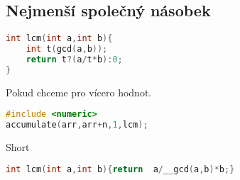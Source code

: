 \documentclass[11pt]{article}
\begin{document}
\subsection{Nejmenší společný násobek}
\begin{lstlisting}[language=C++]
int lcm(int a,int b){
    int t(gcd(a,b));
    return t?(a/t*b):0;
}
\end{lstlisting}
\begin{center}
Pokud chceme pro vícero hodnot.
\end{center}
\begin{lstlisting}[language=C++]
#include <numeric>
accumulate(arr,arr+n,1,lcm);
\end{lstlisting}
Short
\begin{lstlisting}[language=C++]
int lcm(int a,int b){return  a/__gcd(a,b)*b;}
\end{lstlisting}
\end{document}
